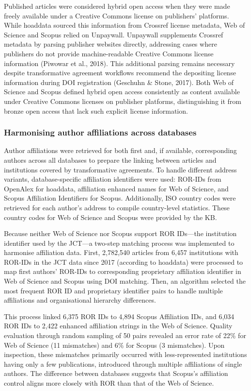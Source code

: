 \documentclass[a4paper,man,floatsintext,longtable,noextraspace,10pt]{apa6}
\begin{document}
Published articles were considered hybrid open access when they were
made freely available under a Creative Commons license on publishers'
platforms. While hoaddata sourced this information from Crossref license
metadata, Web of Science and Scopus relied on Unpaywall. Unpaywall
supplements Crossref metadata by parsing publisher websites directly,
addressing cases where publishers do not provide machine-readable
Creative Commons license information (Piwowar et al., 2018). This
additional parsing remains necessary despite transformative agreement
workflows recommend the depositing license information during DOI
registration (Geschuhn \& Stone, 2017). Both Web of Science and Scopus
defined hybrid open access consistently as content available under
Creative Commons licenses on publisher platforms, distinguishing it from
bronze open access that lack such explicit license information.

\subsubsection{Harmonising author affiliations across
databases}\label{harmonising-author-affiliations-across-databases}

Author affiliations were retrieved for both first and, if available,
corresponding authors across all databases to prepare the linking
between articles and institutions covered by transformative agreements.
To handle different address variants, database-specific affiliation
identifiers were used: ROR-IDs from OpenAlex for hoaddata, affiliation
enhanced names for Web of Science, and Scopus Affiliation Identifiers
for Scopus. Additionally, ISO country codes were retrieved for each
author's address to compile country-level statistics. These country
codes for Web of Science and Scopus were provided by the KB.

Because neither Web of Science nor Scopus support ROR IDs---the
institution identifier used by the JCT---a two-step matching process was
implemented to harmonise affiliation data. First, 2,782,540 articles
from 6,457 institutions with ROR-IDs in the JCT data since 2017
(according to hoaddata) were processed to map first authors' ROR-IDs to
corresponding proprietary affiliation identifier in Web of Science and
Scopus using DOI matching. Then, an algorithm selected the most frequent
ROR ID and proprietary identifier pairs to handle multiple affiliations
and organisational hierarchy differences.

This process linked 6,375 ROR IDs to 4,894 Scopus Affiliation IDs, and
6,034 ROR IDs to 2,422 enhanced affiliation strings in the Web of
Science. Quality evaluation through random sampling of 50 pairs revealed
an error rate of 22\% for Web of Science (11 mismatches) and 6\% for
Scopus (3 mismatches). Upon inspection, these mismatches primarily
occurred with less-represented institutions having only a few
publications, introduced through multiple affiliations of single
authors. The difference between databases suggests that Scopus's
affiliation control aligns more closely with ROR than that of the Web of
Science.
\end{document}
